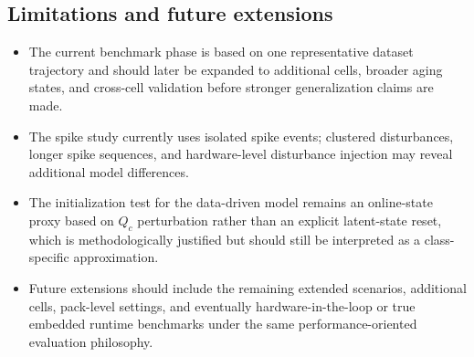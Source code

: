 \documentclass[review]{elsarticle}
\begin{document}
\subsection{Limitations and future extensions}
\begin{itemize}[leftmargin=*]
    \item The current benchmark phase is based on one representative dataset trajectory and should later be expanded to additional cells, broader aging states, and cross-cell validation before stronger generalization claims are made.
    \item The spike study currently uses isolated spike events; clustered disturbances, longer spike sequences, and hardware-level disturbance injection may reveal additional model differences.
    \item The initialization test for the data-driven model remains an online-state proxy based on $Q_c$ perturbation rather than an explicit latent-state reset, which is methodologically justified but should still be interpreted as a class-specific approximation.
    \item Future extensions should include the remaining extended scenarios, additional cells, pack-level settings, and eventually hardware-in-the-loop or true embedded runtime benchmarks under the same performance-oriented evaluation philosophy.
\end{itemize}
\end{document}
